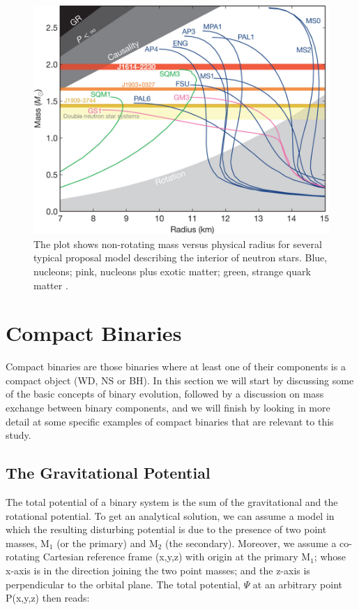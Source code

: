 \begin{figure}[]
        \centering
\includegraphics[scale=.3]{assets/images/es.jpg}
\caption[Neutron star mass-radius relation for different models]{The plot shows non-rotating mass versus physical radius for several typical proposal model describing the interior of neutron stars. Blue, nucleons; pink, nucleons plus exotic matter; green, strange quark matter \citep{2010Natur.467.1081D}.}
\label{fig:nsmod}
\end{figure}


\section[Compact Binaries]{Compact Binaries}\label{sec:cb}

Compact binaries are those binaries where at least one of their components is a compact object (WD, NS or BH). In this section we will start by discussing some of the basic concepts of binary evolution, followed by a discussion on mass exchange between binary components,  and we will finish by looking in more detail at some specific examples of compact binaries that are relevant to this study.   


\subsection{The Gravitational Potential}

The total potential of a binary system is the sum of the gravitational and the rotational potential. To get an analytical solution, we can assume a model in which the resulting disturbing potential is due to the presence of two point masses, M$_1$ (or the primary) and M$_2$ (the secondary). Moreover, we assume a co-rotating Cartesian reference frame (x,y,z) with origin at the primary M$_1$; whose x-axis is in the direction joining the two point masses; and the z-axis is perpendicular to the orbital plane. The total potential, $\Psi$ at an arbitrary point P(x,y,z) then reads:

